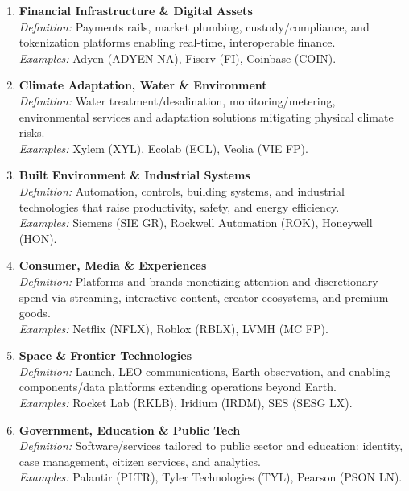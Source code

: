 \documentclass[11pt]{article}
\begin{document}
\begin{enumerate}[leftmargin=*]
\item \textbf{Financial Infrastructure \& Digital Assets}\\
\emph{Definition:} Payments rails, market plumbing, custody/compliance, and tokenization platforms enabling real-time, interoperable finance.\\
\emph{Examples:} Adyen (ADYEN NA), Fiserv (FI), Coinbase (COIN).

\item \textbf{Climate Adaptation, Water \& Environment}\\
\emph{Definition:} Water treatment/desalination, monitoring/metering, environmental services and adaptation solutions mitigating physical climate risks.\\
\emph{Examples:} Xylem (XYL), Ecolab (ECL), Veolia (VIE FP).

\item \textbf{Built Environment \& Industrial Systems}\\
\emph{Definition:} Automation, controls, building systems, and industrial technologies that raise productivity, safety, and energy efficiency.\\
\emph{Examples:} Siemens (SIE GR), Rockwell Automation (ROK), Honeywell (HON).

\item \textbf{Consumer, Media \& Experiences}\\
\emph{Definition:} Platforms and brands monetizing attention and discretionary spend via streaming, interactive content, creator ecosystems, and premium goods.\\
\emph{Examples:} Netflix (NFLX), Roblox (RBLX), LVMH (MC FP).

\item \textbf{Space \& Frontier Technologies}\\
\emph{Definition:} Launch, LEO communications, Earth observation, and enabling components/data platforms extending operations beyond Earth.\\
\emph{Examples:} Rocket Lab (RKLB), Iridium (IRDM), SES (SESG LX).

\item \textbf{Government, Education \& Public Tech}\\
\emph{Definition:} Software/services tailored to public sector and education: identity, case management, citizen services, and analytics.\\
\emph{Examples:} Palantir (PLTR), Tyler Technologies (TYL), Pearson (PSON LN).
\end{enumerate}
\end{document}
